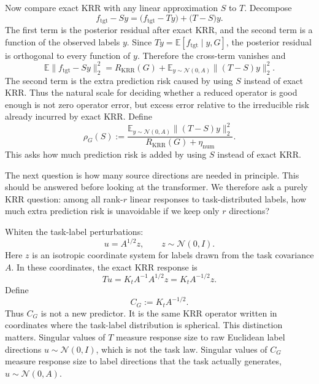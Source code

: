 \documentclass[11pt]{article}
\begin{document}
Now compare exact KRR with any linear approximation \(S\) to \(T\). Decompose
\[
f_{\mathrm{tgt}}-Sy
=
\bigl(f_{\mathrm{tgt}}-Ty\bigr)
+
\bigl(T-S\bigr)y.
\]
The first term is the posterior residual after exact KRR, and the second term is a function of the
observed labels \(y\). Since \(Ty=\mathbb{E}[f_{\mathrm{tgt}}\mid y,G]\), the posterior residual is
orthogonal to every function of \(y\). Therefore the cross-term vanishes and
\[
\mathbb{E}\|f_{\mathrm{tgt}}-Sy\|_2^2
=
R_{\mathrm{KRR}}(G)
+
\mathbb{E}_{y\sim\mathcal{N}(0,A)}\|(T-S)y\|_2^2.
\]
The second term is the extra prediction risk caused by using \(S\) instead of exact KRR. Thus the
natural scale for deciding whether a reduced operator is good enough is not zero operator error, but
excess error relative to the irreducible risk already incurred by exact KRR. Define
\[
\rho_G(S)
:=
\frac{
\mathbb{E}_{y\sim\mathcal{N}(0,A)}\|(T-S)y\|_2^2
}{
R_{\mathrm{KRR}}(G)+\eta_{\mathrm{num}}
}.
\]
This asks how much prediction risk is added by using \(S\) instead of exact KRR.

The next question is how many source directions are needed in principle. This should be answered
before looking at the transformer. We therefore ask a purely KRR question: among all rank-\(r\)
linear responses to task-distributed labels, how much extra prediction risk is unavoidable if we
keep only \(r\) directions?

Whiten the task-label perturbations:
\[
u=A^{1/2}z,\qquad z\sim\mathcal{N}(0,I).
\]
Here \(z\) is an isotropic coordinate system for labels drawn from the task covariance \(A\). In
these coordinates, the exact KRR response is
\[
Tu=K_tA^{-1}A^{1/2}z=K_tA^{-1/2}z.
\]
Define
\[
C_G:=K_tA^{-1/2}.
\]
Thus \(C_G\) is not a new predictor. It is the same KRR operator written in coordinates where the
task-label distribution is spherical. This distinction matters. Singular values of \(T\) measure
response size to raw Euclidean label directions \(u\sim\mathcal{N}(0,I)\), which is not the task
law. Singular values of \(C_G\) measure response size to label directions that the task actually
generates, \(u\sim\mathcal{N}(0,A)\).
\end{document}
